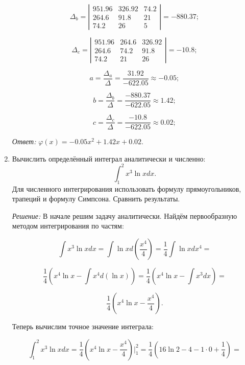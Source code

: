 \documentclass[a4paper, 12pt]{article}
\begin{document}
\begin{enumerate}
{    $$
    \Delta_b =
    \left |
      \begin{array}{ccc}
        951.96 & 326.92 & 74.2 \\
        264.6 & 91.8 & 21 \\
        74.2 & 26 & 5
      \end{array}
    \right |
    = -880.37;
    $$

    $$
    \Delta_c =
    \left |
      \begin{array}{ccc}
        951.96 & 264.6 & 326.92 \\
        264.6 & 74.2 & 91.8 \\
        74.2 & 21 & 26
      \end{array}
    \right |
    = -10.8;
    $$

    $$
    a = \dfrac {\Delta_a} {\Delta} = \dfrac {31.92} {-622.05} \approx -0.05;
    $$

    $$
    b = \dfrac {\Delta_b} {\Delta} = \dfrac {-880.37} {-622.05} \approx 1.42;
    $$

    $$
    c = \dfrac {\Delta_c} {\Delta} = \dfrac {-10.8} {-622.05} \approx 0.02;
    $$

    \emph{Ответ:} $\varphi (x) = -0.05x^2+1.42x+0.02$.
  }
\item{Вычислить определённый интеграл аналитически и численно:
    \begin{equation}\label{eq:1}
    \int_1^2x^3 \ln{x} dx.
    \end{equation}
    Для численного интегрирования использовать формулу прямоугольников, трапеций и формулу Симпсона. Сравнить результаты.

    \emph{Решение:} В начале решим задачу аналитически. Найдём первообразную методом интегрирования по частям:

    $$
    \int x^3 \ln{x} dx = \int \ln{x} d \left ( \dfrac {x^4} {4} \right ) = \dfrac {1} {4} \int \ln{x} d x^4 = 
    $$

    $$
    \dfrac {1} {4} \left ( x^4 \ln{x} - \int x^4 d (\ln x) \right ) = \dfrac {1} {4} \left ( x^4 \ln{x} - \int x^3 d x \right ) = 
    $$

    $$
    \dfrac {1} {4} \left ( x^4 \ln{x} - \dfrac {x^4} {4} \right ).
    $$

    Теперь вычислим точное значение интеграла:

    $$
    \int_1^2x^3 \ln{x} dx = \dfrac {1} {4} \left ( x^4 \ln{x} - \dfrac {x^4} {4} \right ) \Big|_1^2 = \dfrac {1} {4} \left ( 16 \ln 2 - 4 -1 \cdot 0 + \dfrac {1} {4} \right ) = 
    $$
    
}
\end{enumerate}
\end{document}
